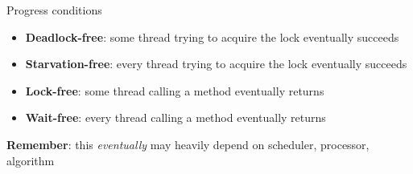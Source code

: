 \begin{frame}[t,noframenumbering]{Progress conditions}

\begin{itemize}

  \item \textbf{Deadlock-free}: some thread trying to acquire the lock eventually succeeds
  \item \textbf{Starvation-free}: every thread trying to acquire the lock eventually succeeds

  \item \textbf{Lock-free}: some thread calling a method eventually returns
  \pause

  \item \textbf{Wait-free}: every thread calling a method eventually returns

\end{itemize}

\pause
\textbf{Remember}: this \textit{eventually} may heavily depend on scheduler, processor, algorithm

\end{frame}

